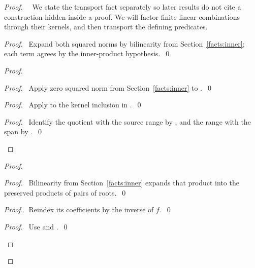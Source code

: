 \begin{proof}
 \pfsketch\ \new\ We state the transport fact separately so later results do not
 cite a construction hidden inside a proof. We will factor finite linear combinations through their kernels, and
 then transport the defining predicates.
 \begin{proof}
  \pf\ Expand both squared norms by bilinearity from Section~\ref{facts:inner}; each term
  agrees by the inner-product hypothesis.~\qed
 \end{proof}
 \begin{proof}
  \begin{proof}\pf\ Apply zero squared norm from Section~\ref{facts:inner} to
   .~\qed\end{proof}
  \begin{proof}\pf\ Apply  to the kernel inclusion
   in .~\qed\end{proof}
  \qedstep
  \begin{proof}\pf\ Identify the quotient with the source range by
   , and the range with the span by
   .~\qed\end{proof}
 \end{proof}
 \begin{proof}
  \begin{proof}\pf\ Bilinearity from Section~\ref{facts:inner} expands that product into
   the preserved products of pairs of roots.~\qed\end{proof}
  \begin{proof}\pf\ Reindex its coefficients by the inverse of $f$.~\qed\end{proof}
  \qedstep
  \begin{proof}\pf\ Use  and .~\qed\end{proof}

\end{proof}
\end{proof}
